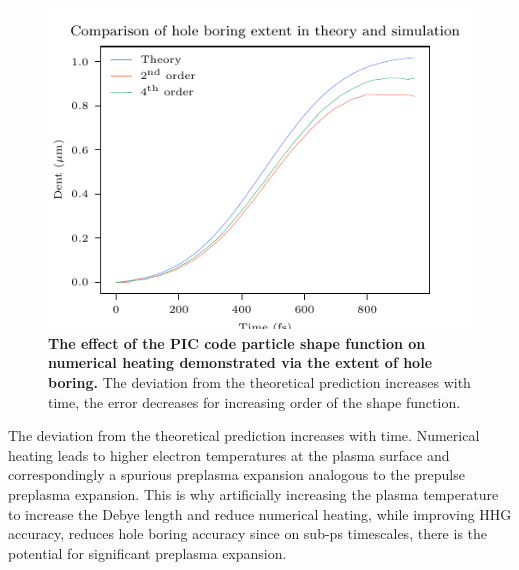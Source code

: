 \begin{figure}
	\centering
	\includegraphics{figures/orion/orion_compare_ion_denting_to_theory}
	\caption[The effect of the PIC code particle shape function on numerical heating.]{\textbf{The effect of the PIC code particle shape function on numerical heating demonstrated via the extent of hole boring.} The deviation from the theoretical prediction increases with time, the error decreases for increasing order of the shape function.}
	\label{fig:orioncompareiondentingtotheory}
\end{figure}
The deviation from the theoretical prediction increases with time. Numerical heating leads to higher electron temperatures at the plasma surface and correspondingly a spurious preplasma expansion analogous to the prepulse preplasma expansion. This is why artificially increasing the plasma temperature to increase the Debye length and reduce numerical heating, while improving HHG accuracy, reduces hole boring accuracy since on sub-ps timescales, there is the potential for significant preplasma expansion.

